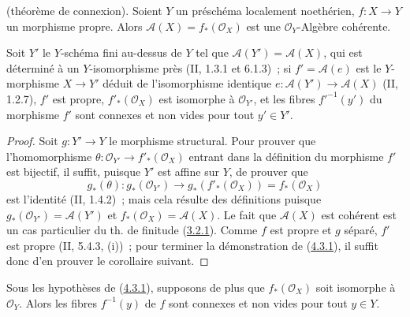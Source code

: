 \begin{theorem}[4.3.1]
\label{III.4.3.1-fr}
\textnormal{(théorème de connexion).}
Soient $Y$ un préschéma localement noethérien, $f:X\to Y$ un morphisme
propre. Alors $\mathcal A(X)=f_*(\mathcal O_X)$ est une
$\mathcal O_Y$-Algèbre cohérente.


Soit $Y'$ le $Y$-schéma fini au-dessus de $Y$ tel que
$\mathcal A(Y')=\mathcal A(X)$, qui est déterminé à un $Y$-isomorphisme
près (II, 1.3.1 et 6.1.3)~; si $f'=\mathcal A(e)$ est le $Y$-morphisme
$X\to Y'$ déduit de l'isomorphisme identique
$e:\mathcal A(Y')\to\mathcal A(X)$ (II, 1.2.7), $f'$ est propre,
$f'_*(\mathcal O_X)$ est isomorphe à $\mathcal O_{Y'}$, et les fibres
$f'^{-1}(y')$ du morphisme $f'$ sont connexes et non vides pour tout
$y'\in Y'$.
\end{theorem}

\begin{proof}
Soit $g:Y'\to Y$ le morphisme structural. Pour prouver que l'homomorphisme
$\theta:\mathcal O_{Y'}\to f'_*(\mathcal O_X)$ entrant dans la définition
du morphisme $f'$ est bijectif, il suffit, puisque $Y'$ est affine sur $Y$,
de prouver que
\[
g_*(\theta):g_*(\mathcal O_{Y'})\longrightarrow
g_*(f'_*(\mathcal O_X))=f_*(\mathcal O_X)
\]
est l'identité (II, 1.4.2)~; mais cela résulte des définitions puisque
$g_*(\mathcal O_{Y'})=\mathcal A(Y')$ et
$f_*(\mathcal O_X)=\mathcal A(X)$. Le fait que $\mathcal A(X)$ est
cohérent est un cas particulier du th. de finitude
(\hyperref[III.3.2.1-fr]{3.2.1}). Comme $f$ est propre et $g$ séparé,
$f'$ est propre (II, 5.4.3, (i))~; pour terminer la démonstration de
(\hyperref[III.4.3.1-fr]{4.3.1}), il suffit donc d'en prouver le corollaire
suivant.
\end{proof}

\begin{corollary}[4.3.2]
\label{III.4.3.2-fr}
Sous les hypothèses de (\hyperref[III.4.3.1-fr]{4.3.1}), supposons de plus
que $f_*(\mathcal O_X)$ soit isomorphe à $\mathcal O_Y$. Alors les fibres
$f^{-1}(y)$ de $f$ sont connexes et non vides pour tout $y\in Y$.
\end{corollary}

